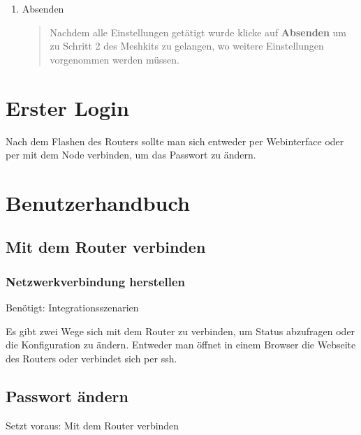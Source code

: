 \documentclass[a4paper,12pt,ngerman]{sphinxmanual}
\begin{document}
\begin{enumerate}
\begin{quote}
\begin{center}
\begin{tabulary}{\linewidth}{|L|L|}
Email
 & 
Wenn angegeben wird nachdem das Image gebaut wurde eine Mail an diese
Adresse geschickt.
\\\hline
\end{tabulary}\end{center}

\end{quote}

\item {} 
Absenden
\begin{quote}

Nachdem alle Einstellungen getätigt wurde klicke auf \textbf{Absenden} um zu
Schritt 2 des Meshkits zu gelangen, wo weitere Einstellungen vorgenommen
werden müssen.
\end{quote}

\end{enumerate}


\chapter{Erster Login}
\label{firstlogin::doc}\label{firstlogin:erster-login}
Nach dem Flashen des Routers sollte man sich entweder per Webinterface oder
per  mit dem Node verbinden, um das Passwort zu ändern.


\chapter{Benutzerhandbuch}
\label{usage/index::doc}\label{usage/index:benutzerhandbuch}

\section{Mit dem Router verbinden}
\label{usage/connect-router::doc}\label{usage/connect-router:mit-dem-router-verbinden}

\subsection{Netzwerkverbindung herstellen}
\label{usage/connect-router:netzwerkverbindung-herstellen}
Benötigt: Integrationsszenarien

Es gibt zwei Wege sich mit dem Router zu verbinden, um Status abzufragen
oder die Konfiguration zu ändern. Entweder man öffnet in
einem Browser die Webseite des Routers oder verbindet sich per ssh.


\section{Passwort ändern}
\label{usage/change-password::doc}\label{usage/change-password:passwort-andern}
Setzt voraus: Mit dem Router verbinden
\end{document}
